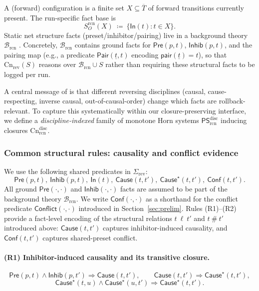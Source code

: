 \documentclass[twoside]{article}
\newcommand{\Cn}{\mathrm{Cn}}
\newcommand{\1}{\mathbf{1}}
\begin{document}
A (forward) configuration is a finite set \(X\subseteq \overline{T}\) of forward transitions currently present.
The run-specific fact base is
\[
S_O^{\mathrm{rcn}}(X)\ \coloneqq\ \{\mathsf{In}(t): t\in X\}.
\]
Static net structure facts (preset/inhibitor/pairing) live in a background theory \(\mathcal{B}_{\mathrm{rcn}}\) \cite[\S7]{melgratti2024reversible}.
Concretely, \(\mathcal{B}_{\mathrm{rcn}}\) contains ground facts for \(\mathsf{Pre}(p,t)\), \(\mathsf{Inhib}(p,t)\), and the pairing map
(e.g., a predicate \(\mathsf{Pair}(\underline{t},t)\) encoding \(\mathsf{pair}(\underline{t})=t\)),
so that \(\Cn_{\mathrm{rev}}(S)\) reasons over \(\mathcal{B}_{\mathrm{rcn}}\cup S\) rather than requiring these structural facts to be logged per run.

A central message of \cite{melgratti2024reversible} is that different reversing disciplines
(causal, cause-respecting, inverse causal, out-of-causal-order) change which facts are rollback-relevant.
To capture this systematically within our closure-preserving interface, we define a
\emph{discipline-indexed} family of monotone Horn systems
\(\mathsf{PS}^{\mathrm{disc}}_{\mathrm{rcn}}\) inducing closures \(\Cn^{\mathrm{disc}}_{\mathrm{rcn}}\).

\subsubsection{Common structural rules: causality and conflict evidence}
\label{sec:rcn-common-rules}

We use the following shared predicates in \(\Sigma_{\mathrm{rev}}\):
\[
\mathsf{Pre}(p,t),\ \mathsf{Inhib}(p,t),\ \mathsf{In}(t),\
\mathsf{Cause}(t,t'),\ \mathsf{Cause}^\star(t,t'),\
\mathsf{Conf}(t,t').
\]
All ground \(\mathsf{Pre}(\cdot,\cdot)\) and \(\mathsf{Inhib}(\cdot,\cdot)\) facts are assumed to be part of the background theory
\(\mathcal{B}_{\mathrm{rcn}}\).
We write \(\mathsf{Conf}(\cdot,\cdot)\) as a shorthand for the conflict predicate \(\mathsf{Conflict}(\cdot,\cdot)\) introduced in
Section~\ref{sec:prelim}.
Rules (R1)--(R2) provide a fact-level encoding of the structural relations \(t\ \ell\ t'\) and \(t\ \#\ t'\) introduced above:
\(\mathsf{Cause}(t,t')\) captures inhibitor-induced causality, and \(\mathsf{Conf}(t,t')\) captures shared-preset conflict.

\paragraph{(R1) Inhibitor-induced causality and its transitive closure.}
\[
\mathsf{Pre}(p,t)\wedge \mathsf{Inhib}(p,t')\Rightarrow \mathsf{Cause}(t,t'),
\qquad
\mathsf{Cause}(t,t')\Rightarrow \mathsf{Cause}^\star(t,t'),
\]
\[
\mathsf{Cause}^\star(t,u)\wedge \mathsf{Cause}^\star(u,t')\Rightarrow \mathsf{Cause}^\star(t,t').
\]
\end{document}
